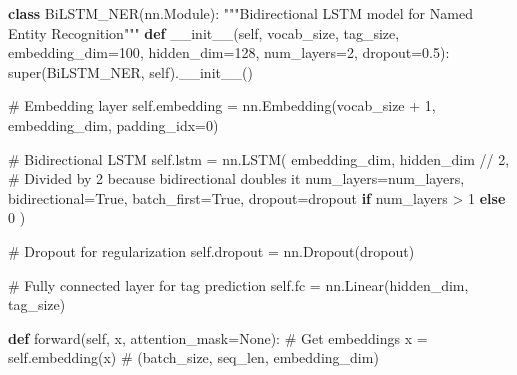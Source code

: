 \documentclass[
]{article}
\newenvironment{Shaded}{\begin{snugshade}}{\end{snugshade}}
\newcommand{\BuiltInTok}[1]{\textcolor[rgb]{0.00,0.23,0.31}{#1}}
\newcommand{\CommentTok}[1]{\textcolor[rgb]{0.37,0.37,0.37}{#1}}
\newcommand{\ControlFlowTok}[1]{\textcolor[rgb]{0.00,0.23,0.31}{\textbf{#1}}}
\newcommand{\DecValTok}[1]{\textcolor[rgb]{0.68,0.00,0.00}{#1}}
\newcommand{\FloatTok}[1]{\textcolor[rgb]{0.68,0.00,0.00}{#1}}
\newcommand{\FunctionTok}[1]{\textcolor[rgb]{0.28,0.35,0.67}{#1}}
\newcommand{\KeywordTok}[1]{\textcolor[rgb]{0.00,0.23,0.31}{\textbf{#1}}}
\newcommand{\NormalTok}[1]{\textcolor[rgb]{0.00,0.23,0.31}{#1}}
\newcommand{\OperatorTok}[1]{\textcolor[rgb]{0.37,0.37,0.37}{#1}}
\newcommand{\VariableTok}[1]{\textcolor[rgb]{0.07,0.07,0.07}{#1}}
\begin{document}
\begin{Shaded}
\begin{Highlighting}[]
\KeywordTok{class}\NormalTok{ BiLSTM\_NER(nn.Module):}
    \CommentTok{"""Bidirectional LSTM model for Named Entity Recognition"""}
    \KeywordTok{def} \FunctionTok{\_\_init\_\_}\NormalTok{(}\VariableTok{self}\NormalTok{, vocab\_size, tag\_size, embedding\_dim}\OperatorTok{=}\DecValTok{100}\NormalTok{, hidden\_dim}\OperatorTok{=}\DecValTok{128}\NormalTok{, num\_layers}\OperatorTok{=}\DecValTok{2}\NormalTok{, dropout}\OperatorTok{=}\FloatTok{0.5}\NormalTok{):}
        \BuiltInTok{super}\NormalTok{(BiLSTM\_NER, }\VariableTok{self}\NormalTok{).}\FunctionTok{\_\_init\_\_}\NormalTok{()}
        
        \CommentTok{\# Embedding layer}
        \VariableTok{self}\NormalTok{.embedding }\OperatorTok{=}\NormalTok{ nn.Embedding(vocab\_size }\OperatorTok{+} \DecValTok{1}\NormalTok{, embedding\_dim, padding\_idx}\OperatorTok{=}\DecValTok{0}\NormalTok{)}
        
        \CommentTok{\# Bidirectional LSTM}
        \VariableTok{self}\NormalTok{.lstm }\OperatorTok{=}\NormalTok{ nn.LSTM(}
\NormalTok{            embedding\_dim,}
\NormalTok{            hidden\_dim }\OperatorTok{//} \DecValTok{2}\NormalTok{,  }\CommentTok{\# Divided by 2 because bidirectional doubles it}
\NormalTok{            num\_layers}\OperatorTok{=}\NormalTok{num\_layers,}
\NormalTok{            bidirectional}\OperatorTok{=}\VariableTok{True}\NormalTok{,}
\NormalTok{            batch\_first}\OperatorTok{=}\VariableTok{True}\NormalTok{,}
\NormalTok{            dropout}\OperatorTok{=}\NormalTok{dropout }\ControlFlowTok{if}\NormalTok{ num\_layers }\OperatorTok{\textgreater{}} \DecValTok{1} \ControlFlowTok{else} \DecValTok{0}
\NormalTok{        )}
        
        \CommentTok{\# Dropout for regularization}
        \VariableTok{self}\NormalTok{.dropout }\OperatorTok{=}\NormalTok{ nn.Dropout(dropout)}
        
        \CommentTok{\# Fully connected layer for tag prediction}
        \VariableTok{self}\NormalTok{.fc }\OperatorTok{=}\NormalTok{ nn.Linear(hidden\_dim, tag\_size)}
    
    \KeywordTok{def}\NormalTok{ forward(}\VariableTok{self}\NormalTok{, x, attention\_mask}\OperatorTok{=}\VariableTok{None}\NormalTok{):}
        \CommentTok{\# Get embeddings}
\NormalTok{        x }\OperatorTok{=} \VariableTok{self}\NormalTok{.embedding(x)  }\CommentTok{\# (batch\_size, seq\_len, embedding\_dim)}
        

\end{Highlighting}
\end{Shaded}
\end{document}
